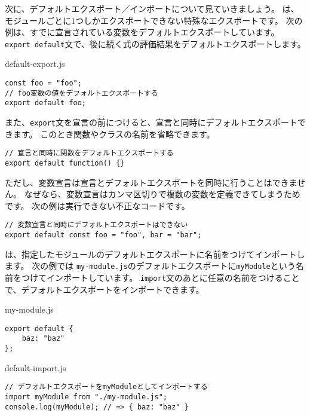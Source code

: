次に、デフォルトエクスポート／インポートについて見ていきましょう。
\textbf{}は、モジュールごとに1つしかエクスポートできない特殊なエクスポートです。
次の例は、すでに宣言されている変数をデフォルトエクスポートしています。
\texttt{export default}文で、後に続く式の評価結果をデフォルトエクスポートします。

\begin{listtitle}
default-export.js
\end{listtitle}
\begin{lstlisting}
const foo = "foo";
// foo変数の値をデフォルトエクスポートする
export default foo;
\end{lstlisting}
\listend

また、\texttt{export}文を宣言の前につけると、宣言と同時にデフォルトエクスポートできます。
このとき関数やクラスの名前を省略できます。

\begin{lstlisting}
// 宣言と同時に関数をデフォルトエクスポートする
export default function() {}
\end{lstlisting}

ただし、変数宣言は宣言とデフォルトエクスポートを同時に行うことはできません。
なぜなら、変数宣言はカンマ区切りで複数の変数を定義できてしまうためです。
次の例は実行できない不正なコードです。\enlargethispage{\baselineskip}

\begin{lstlisting}
// 変数宣言と同時にデフォルトエクスポートはできない
export default const foo = "foo", bar = "bar";
\end{lstlisting}

\textbf{}は、指定したモジュールのデフォルトエクスポートに名前をつけてインポートします。
次の例では
\texttt{my-module.js}のデフォルトエクスポートに\texttt{myModule}という名前をつけてインポートしています。
\texttt{import}文のあとに任意の名前をつけることで、デフォルトエクスポートをインポートできます。

\begin{listtitle}
my-module.js
\end{listtitle}
\begin{lstlisting}
export default {
    baz: "baz"
};
\end{lstlisting}
\listend

\begin{listtitle}
default-import.js
\end{listtitle}
\begin{lstlisting}
// デフォルトエクスポートをmyModuleとしてインポートする
import myModule from "./my-module.js";
console.log(myModule); // => { baz: "baz" }
\end{lstlisting}
\listend

